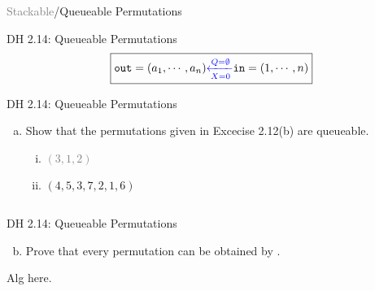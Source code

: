 \begin{frame}{}
  \centerline{\LARGE \textcolor{gray}{Stackable}/Queueable Permutations}
\end{frame}

\begin{frame}{}
  \begin{exampleblock}{DH 2.14: Queueable Permutations}
    \[
      \fbox{$\texttt{out} = (a_1, \cdots, a_n) \textcolor{blue}{\xleftarrow[X = 0]{Q = \emptyset}} \texttt{in} = (1, \cdots, n)$}
    \]

  \end{exampleblock}
\end{frame}

\begin{frame}{}
  \begin{exampleblock}{DH 2.14: Queueable Permutations}
    \begin{enumerate}[(a)]
      \item Show that the permutations given in Excecise 2.12(b) are queueable.
	\begin{enumerate}[(i)]
	  \item \textcolor{gray}{$(3,1,2)$}
	  \item $(4,5,3,7,2,1,6)$
	\end{enumerate}
    \end{enumerate}

    \begin{columns}
    \end{columns}
  \end{exampleblock}
\end{frame}


\begin{frame}{}
  \begin{exampleblock}{DH 2.14: Queueable Permutations}
    \begin{enumerate}[(a)]
      \setcounter{enumi}{1}
      \item Prove that every permutation can be obtained by .
    \end{enumerate}
  \end{exampleblock}

  Alg here.
\end{frame}

